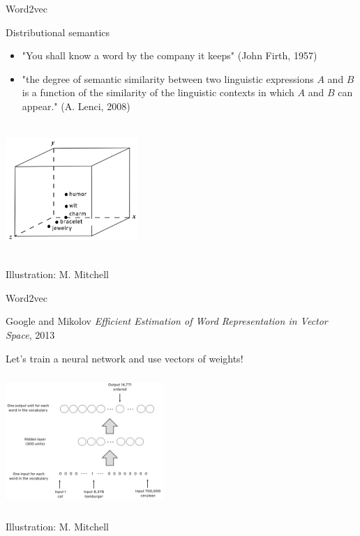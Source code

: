 \documentclass[
  10pt,
  ignorenonframetext,
  x11names, dvipsnames, bibspacing, natbib, table]{beamer}
\begin{document}
\begin{frame}{Word2vec}
\protect\hypertarget{word2vec-4}{}
\begin{block}{Distributional semantics}
\protect\hypertarget{distributional-semantics}{}
\begin{itemize}
\item "You shall know a word by the company it keeps" (John Firth, 1957)


\item "the degree of semantic similarity between two linguistic expressions $A$ and $B$ is a function of the similarity of the linguistic contexts in which $A$ and $B$ can appear." (A. Lenci, 2008)


\end{itemize}

\pause

\begin{center}
 \includegraphics[height = 5cm, width = 5cm]{images/similarity1.png}
\end{center}

\vspace{-3mm}

\tiny \hfill \color{gray}Illustration: M. Mitchell \color{black}
\end{block}
\end{frame}

\begin{frame}{Word2vec}
\protect\hypertarget{word2vec-5}{}
\begin{block}{Google and Mikolov}
\protect\hypertarget{google-and-mikolov}{}
\emph{Efficient Estimation of Word Representation in Vector Space}, 2013

Let's train a neural network and use vectors of weights!

\begin{center}
 \includegraphics[height = 5cm, width = 6cm]{images/word2vec1.png}
\end{center}

\vspace{-3mm}

\tiny \hfill \color{gray}Illustration: M. Mitchell \color{black}
\end{block}
\end{frame}
\end{document}

